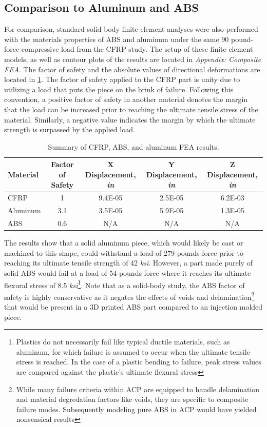 \clearpage

\subsection{Comparison to Aluminum and ABS}

\indent

For comparison, standard solid-body finite element analyses were also performed with the materials properties of ABS and aluminum under the same 90 pound-force compressive load from the CFRP study. The setup of these finite element models, as well as contour plots of the results are located in \textit{Appendix: Composite FEA}. The factor of safety and the absolute values of directional deformations are located in \ref{tab:fea-cfrp-al-abs}. The factor of safety applied to the CFRP part is unity due to utilizing a load that puts the piece on the brink of failure. Following this convention, a positive factor of safety in another material denotes the margin that the load can be increased prior to reaching the ultimate tensile stress of the material. Similarly, a negative value indicates the margin by which the ultimate strength is surpassed by the applied load.

\begin{table}[htp]
    \centering
    \begin{tabular}{lcccc}
    
        Material & Factor of Safety & X Displacement, \emph{in} & Y Displacement, \emph{in} & Z Displacement, \emph{in} \\ \hline
        CFRP & 1 & 9.4E-05 & 2.5E-05 & 6.2E-03 \\
        Aluminum & 3.1 & 3.5E-05 & 5.9E-05 & 1.3E-05 \\
        ABS & 0.6 & N/A & N/A & N/A \\
                
    \end{tabular}
    \caption{Summary of CFRP, ABS, and aluminum FEA results.}
    \label{tab:fea-cfrp-al-abs}
\end{table}

The results show that a solid aluminum piece, which would likely be cast or machined to this shape, could withstand a load of 279 pounds-force prior to reaching its ultimate tensile strength of 42 \emph{ksi}. However, a part made purely of solid ABS would fail at a load of 54 pounds-force where it reaches its ultimate flexural stress of 8.5 \emph{ksi}\footnote{Plastics do not necessarily fail like typical ductile materials, such as aluminum, for which failure is assumed to occur when the ultimate tensile stress is reached. In the case of a plastic bending to failure, peak stress values are compared against the plastic's ultimate flexural stress}. Note that as a solid-body study, the ABS factor of safety is highly conservative as it negates the effects of voids and delamination\footnote{While many failure criteria within ACP are equipped to handle delamination and material degredation factors like voids, they are specific to composite failure modes. Subsequently modeling pure ABS in ACP would have yielded nonsensical results} that would be present in a 3D printed ABS part compared to an injection molded piece.\\


